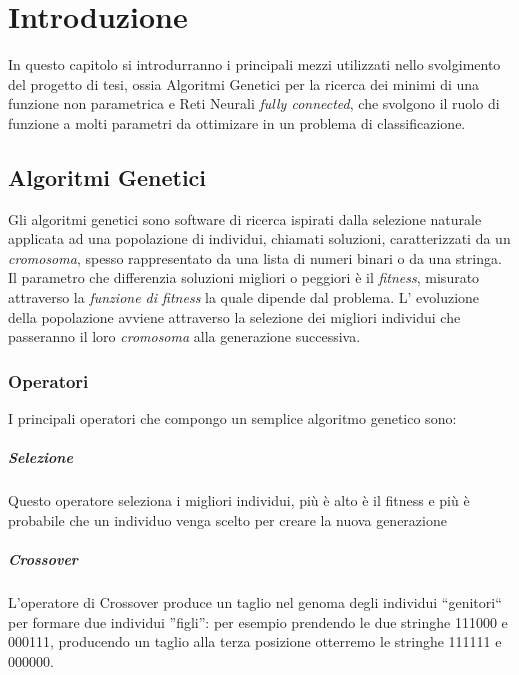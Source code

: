 \documentclass[12pt,a4paper]{report}
\begin{document}
\thispagestyle{empty}
\clearpage\null\newpage

\tableofcontents


\chapter{Introduzione}

In questo capitolo si introdurranno i principali mezzi utilizzati nello svolgimento del progetto di tesi, ossia Algoritmi Genetici per la ricerca dei minimi di una funzione non parametrica e Reti Neurali \textit{fully connected}, che svolgono il ruolo di funzione a molti parametri da ottimizare in un problema di classificazione.

\section{Algoritmi Genetici}\label{alg-gen} 

Gli algoritmi genetici sono software di ricerca ispirati dalla selezione naturale applicata ad una popolazione di individui, chiamati soluzioni, caratterizzati da un \textit{cromosoma}, spesso rappresentato da una lista di numeri binari o da una  stringa.
Il parametro che differenzia soluzioni migliori o peggiori è il \textit{fitness}, misurato attraverso la \textit{funzione di fitness} la quale dipende dal problema.
L' evoluzione della popolazione avviene attraverso la selezione dei migliori individui che passeranno il loro \textit{cromosoma} alla generazione successiva.

\subsection{Operatori}

\cite{genetic-algorithm-mitchell}
I principali operatori che compongo un semplice algoritmo genetico sono:

\paragraph{Selezione} Questo operatore seleziona i migliori individui, più è alto è il fitness e più è probabile che un individuo venga scelto per creare la nuova generazione

\paragraph{Crossover} L'operatore di Crossover produce un taglio nel genoma degli individui ``genitori`` per formare due individui ''figli'': per esempio prendendo le due stringhe 111000 e 000111, producendo un taglio alla terza posizione otterremo le stringhe  111111 e 000000.
\end{document}
